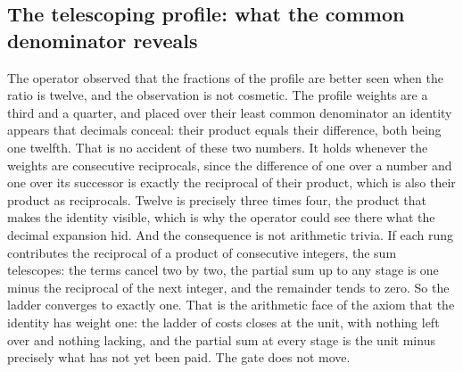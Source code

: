 \documentclass[11pt]{article}
\theoremstyle{definition}\newtheorem{deriv}{Derivation}
\begin{document}
\subsection*{The telescoping profile: what the common denominator reveals}The operator observed that the fractions of the profile are better seen when the ratio is twelve, and the observation is not cosmetic. The profile weights are a third and a quarter, and placed over their least common denominator an identity appears that decimals conceal: their product equals their difference, both being one twelfth. That is no accident of these two numbers. It holds whenever the weights are consecutive reciprocals, since the difference of one over a number and one over its successor is exactly the reciprocal of their product, which is also their product as reciprocals. Twelve is precisely three times four, the product that makes the identity visible, which is why the operator could see there what the decimal expansion hid. And the consequence is not arithmetic trivia. If each rung contributes the reciprocal of a product of consecutive integers, the sum telescopes: the terms cancel two by two, the partial sum up to any stage is one minus the reciprocal of the next integer, and the remainder tends to zero. So the ladder converges to exactly one. That is the arithmetic face of the axiom that the identity has weight one: the ladder of costs closes at the unit, with nothing left over and nothing lacking, and the partial sum at every stage is the unit minus precisely what has not yet been paid. The gate does not move.
\end{document}
